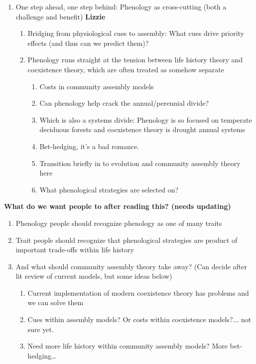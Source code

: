 \documentclass[11pt]{article}
\begin{document}
\begin{enumerate}
\item One step ahead, one step behind: Phenology as cross-cutting (both a challenge and benefit) {\bf Lizzie}  %
\begin{enumerate}
\item Bridging from physiological cues to assembly: What cues drive priority effects (and thus can we predict them)?
\item Phenology runs straight at the tension between life history theory and coexistence theory, which are often treated as somehow separate %
\begin{enumerate}
\item Costs in community assembly models %
\item Can phenology help crack the annual/perennial divide? 
\item Which is also a systems divide: Phenology is so focused on temperate deciduous forests and coexistence theory is drought annual systems 
\item Bet-hedging, it's a bad romance. 
\item Transition briefly in to evolution and community assembly theory here %
\item What phenological strategies are selected on?
\end{enumerate}
\end{enumerate}
\end{enumerate}




{\bf What do we want people to after reading this? (needs updating)} 
\begin{enumerate}
\item Phenology people should recognize phenology as one of many traits
\item Trait people should recognize that phenological strategies are product of important trade-offs within life history
\item And what should community assembly theory take away? (Can decide after lit review of current models, but some ideas below)
\begin{enumerate}
\item Current implementation of modern coexistence theory has problems and we can solve them %
\item Cues within assembly models? Or costs within coexistence models?... not sure yet. 
\item Need more life history within community assembly models? More bet-hedging… 
\end{enumerate}
\end{enumerate}
\end{document}
